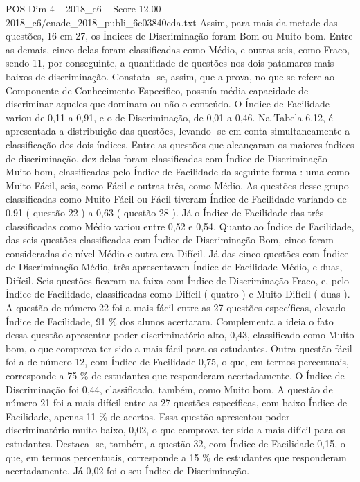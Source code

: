 \begin{textsample}{POS Dim 4 – 2018\_c6 – Score 12.00 – 2018\_c6/enade\_2018\_publi\_6e03840cda.txt}
Assim, para mais da metade das questões, 16 em 27, os Índices de Discriminação foram Bom ou Muito bom.
Entre as demais, cinco delas foram classificadas como Médio, e outras seis, como Fraco, sendo 11, por conseguinte, a quantidade de questões nos dois patamares mais baixos de discriminação.
Constata -se, assim, que a prova, no que se refere ao Componente de Conhecimento Específico, possuía média capacidade de discriminar aqueles que dominam ou não o conteúdo.
O Índice de Facilidade variou de 0,11 a 0,91, e o de Discriminação, de 0,01 a 0,46.
Na Tabela 6.12, é apresentada a distribuição das questões, levando -se em conta simultaneamente a classificação dos dois índices.
Entre as questões que alcançaram os maiores índices de discriminação, dez delas foram classificadas com Índice de Discriminação Muito bom, classificadas pelo Índice de Facilidade da seguinte forma : uma como Muito Fácil, seis, como Fácil e outras três, como Médio.
As questões desse grupo classificadas como Muito Fácil ou Fácil tiveram Índice de Facilidade variando de 0,91 ( questão 22 ) a 0,63 ( questão 28 ).
Já o Índice de Facilidade das três classificadas como Médio variou entre 0,52 e 0,54.
Quanto ao Índice de Facilidade, das seis questões classificadas com Índice de Discriminação Bom, cinco foram consideradas de nível Médio e outra era Difícil.
Já das cinco questões com Índice de Discriminação Médio, três apresentavam Índice de Facilidade Médio, e duas, Difícil.
Seis questões ficaram na faixa com Índice de Discriminação Fraco, e, pelo Índice de Facilidade, classificadas como Difícil ( quatro ) e Muito Difícil ( duas ).
A questão de número 22 foi a mais fácil entre as 27 questões específicas, elevado Índice de Facilidade, 91 \% dos alunos acertaram.
Complementa a ideia o fato dessa questão apresentar poder discriminatório alto, 0,43, classificado como Muito bom, o que comprova ter sido a mais fácil para os estudantes.
Outra questão fácil foi a de número 12, com Índice de Facilidade 0,75, o que, em termos percentuais, corresponde a 75 \% de estudantes que responderam acertadamente.
O Índice de Discriminação foi 0,44, classificado, também, como Muito bom.
A questão de número 21 foi a mais difícil entre as 27 questões específicas, com baixo Índice de Facilidade, apenas 11 \% de acertos.
Essa questão apresentou poder discriminatório muito baixo, 0,02, o que comprova ter sido a mais difícil para os estudantes.
Destaca -se, também, a questão 32, com Índice de Facilidade 0,15, o que, em termos percentuais, corresponde a 15 \% de estudantes que responderam acertadamente.
Já 0,02 foi o seu Índice de Discriminação.

\end{textsample}
